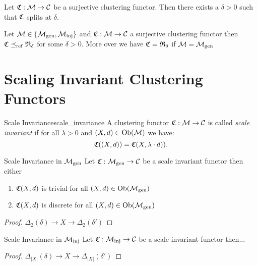 \begin{corollary}{}{}
\newresult

Let $\mathfrak{C}: \mathcal{M} \to \mathcal{C}$ be a surjective clustering functor. Then there exists a $\delta > 0$ such that $\mathfrak{C}$ splits at $\delta$.
\end{corollary}

\begin{corollary}{}{}
\newresult
Let $\mathcal{M} \in \{{\mathcal{M}_\mathrm{gen}}, {\mathcal{M}_\mathrm{inj}}\}$ and $\mathfrak{C}: \mathcal{M} \to \mathcal{C}$ a surjective clustering functor then $\mathfrak{C} \preceq_\mathrm{ref} \mathfrak{R}_\delta$ for some $\delta > 0$. More over we have $\mathfrak{C} = \mathfrak{R}_\delta$ if $\mathcal{M} = {\mathcal{M}_\mathrm{gen}}$
\end{corollary}

\section{Scaling Invariant Clustering Functors}

\begin{definition}{Scale Invariance}{scale_invariance}
A clustering functor $\mathfrak{C}: \mathcal{M} \to \mathcal{C}$ is called \emph{scale invariant} if for all $\lambda > 0$ and $(X,d) \in \mathrm {Ob}(\mathcal{M})$ we have:
\begin{equation*}
    \mathfrak{C}((X,d)) = \mathfrak{C}(X,\lambda \cdot d)).
\end{equation*}
\end{definition}

\begin{proposition}{Scale Invariance in ${\mathcal{M}_\mathrm{gen}}$}{}
Let $\mathfrak{C}: {\mathcal{M}_\mathrm{gen}} \to \mathcal{C}$ be a scale invariant functor then either
\begin{enumerate}
    \item $\mathfrak{C}(X,d)$ is trivial for all $(X,d) \in \mathrm {Ob}({\mathcal{M}_\mathrm{gen}})$
    \item $\mathfrak{C}(X,d)$ is discrete for all $(X,d) \in \mathrm {Ob}({\mathcal{M}_\mathrm{gen}})$
\end{enumerate}
\end{proposition}

\begin{proof}
$\Delta_2(\delta) \to X \to \Delta_2(\delta')$
\end{proof}

\begin{proposition}{Scale Invariance in ${\mathcal{M}_\mathrm{inj}}$}{}
Let $\mathfrak{C}: {\mathcal{M}_\mathrm{inj}} \to \mathcal{C}$ be a scale invariant functor then...
\end{proposition}

\begin{proof}
$\Delta_{|X|}(\delta) \to X \to \Delta_{|X|}(\delta')$
\end{proof}